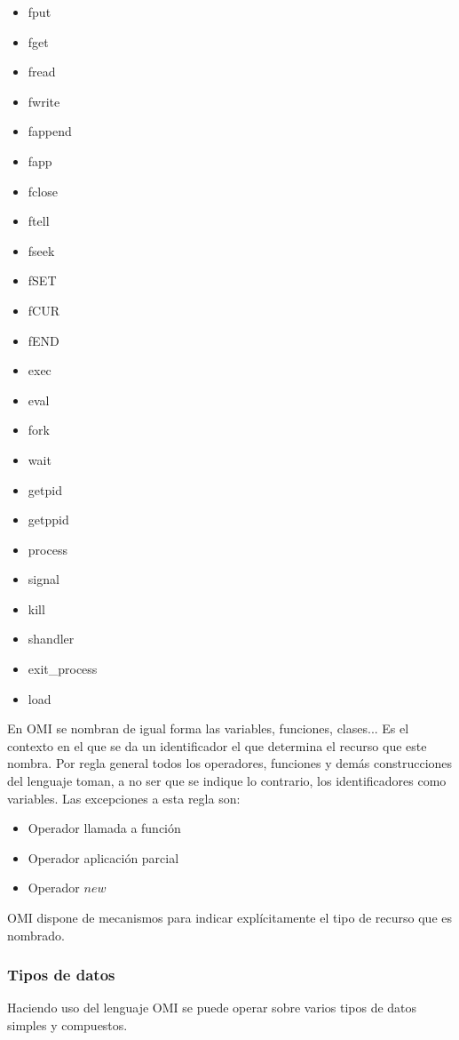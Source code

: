 \begin{multicols}{3}
\begin{itemize}
\item fput 
\item fget 
\item fread 
\item fwrite 
\item fappend 
\item fapp 
\item fclose 
\item ftell 
\item fseek 
\item fSET 
\item fCUR 
\item fEND 
\item exec 
\item eval 
\item fork 
\item wait 
\item getpid 
\item getppid 
\item process 
\item signal 
\item kill 
\item shandler 
\item exit\_process 
\item load 
\end{itemize}
\end{multicols}

En OMI se nombran de igual forma las variables, funciones, clases... Es el contexto 
en el que se da un identificador el que determina el recurso que este nombra. 
Por regla general todos los operadores, funciones y demás construcciones del lenguaje toman, 
a no ser que se indique lo contrario, los identificadores como variables. Las excepciones a esta regla son:

\begin {itemize}
   \item Operador llamada a función 
   \item Operador aplicación parcial
   \item Operador $new$
\end{itemize}

OMI dispone de mecanismos para indicar explícitamente el tipo de recurso que es nombrado.

\subsubsection{Tipos de datos}\label{sec:data_type}
Haciendo uso del lenguaje OMI se puede operar sobre varios tipos de datos simples y compuestos. 


